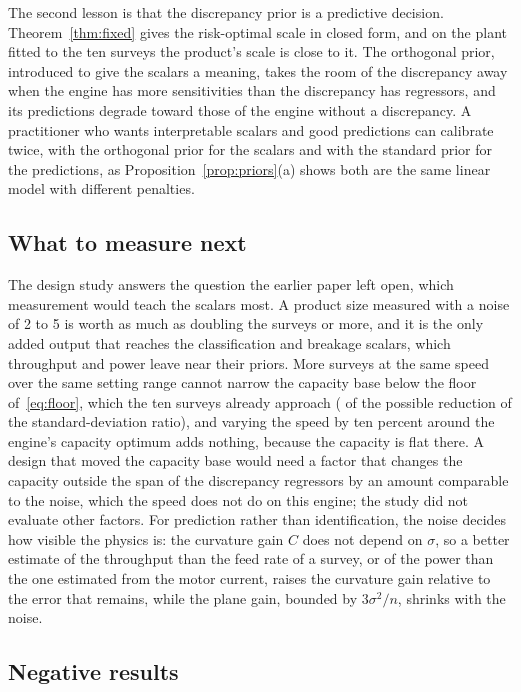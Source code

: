 The second lesson is that the discrepancy prior is a predictive decision. Theorem~\ref{thm:fixed} gives the risk-optimal scale
in closed form, and on the plant fitted to the ten surveys the product's scale is close to it. The orthogonal prior, introduced
to give the scalars a meaning, takes the room of the discrepancy away when the engine has more sensitivities than the
discrepancy has regressors, and its predictions degrade toward those of the engine without a discrepancy. A practitioner who
wants interpretable scalars and good predictions can calibrate twice, with the orthogonal prior for the scalars and with the
standard prior for the predictions, as Proposition~\ref{prop:priors}(a) shows both are the same linear model with different
penalties.

\subsection{What to measure next}

The design study answers the question the earlier paper left open, which measurement would teach the scalars most. A product
size measured with a noise of 2 to 5\pct{} is worth as much as doubling the surveys or more, and it is the only added output
that reaches the classification and breakage scalars, which throughput and power leave near their priors. More surveys at the
same speed over the same setting range cannot narrow the capacity base below the floor of~\eqref{eq:floor}, which the ten surveys
already approach (\ceilShare\pct{} of the possible reduction of the standard-deviation ratio), and varying the speed by ten percent around the engine's capacity optimum adds
nothing, because the capacity is flat there. A design that moved the capacity base would need a factor that changes the
capacity outside the span of the discrepancy regressors by an amount comparable to the noise, which the speed does not do on
this engine; the study did not evaluate other factors. For prediction rather than identification, the noise decides how visible the physics is: the
curvature gain $C$ does not depend on $\sigma$, so a better estimate of the throughput than the feed rate of a survey, or of the
power than the one estimated from the motor current, raises the curvature gain relative to the error that remains, while the
plane gain, bounded by $3\sigma^2/n$, shrinks with the noise.

\subsection{Negative results}

